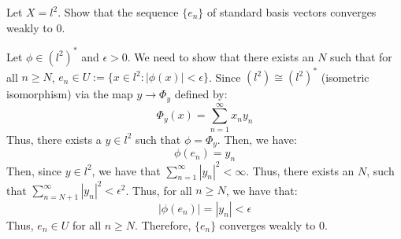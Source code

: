\documentclass[12pt]{article}
\begin{document}
\begin{problem}{60}
    Let $X = l^2$. Show that the sequence $\{e_n\}$ of standard basis vectors converges weakly to $0$. 
\end{problem}
\begin{solution}
    Let $\phi \in (l^2)^*$ and $\epsilon > 0$. We need to show that there exists an $N$ such that for all $n \geq N$, $e_n \in U := \{x \in l^2: |\phi(x)| < \epsilon\}$. Since $(l^2) \cong (l^2)^*$ (isometric isomorphism) via the map $y \to \Phi_y$ defined by: 
    \[ \Phi_y(x) = \sum_{n=1}^\infty x_ny_n\]
    Thus, there exists a $y \in l^2$ such that $\phi = \Phi_y$. Then, we have:
    \[ \phi(e_n) = y_n \]
    Then, since $y \in l^2$, we have that $\sum_{n=1}^\infty |y_n|^2 < \infty$. Thus, there exists an $N$, such that $\sum_{n=N+1}^\infty |y_n|^2 < \epsilon^2$. Thus, for all $n \geq N$, we have that: 
    \[ |\phi(e_n)| = |y_n| < \epsilon\]
    Thus, $e_n \in U$ for all $n \geq N$. Therefore, $\{e_n\}$ converges weakly to $0$. \bbni
\end{solution}
\newpage
\end{document}
